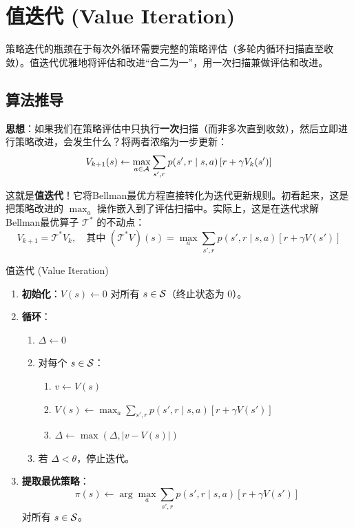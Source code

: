 \section{值迭代 (Value Iteration)}

策略迭代的瓶颈在于每次外循环需要完整的策略评估（多轮内循环扫描直至收敛）。值迭代优雅地将评估和改进``合二为一''，用一次扫描兼做评估和改进。

\subsection{算法推导}

\textbf{思想}：如果我们在策略评估中只执行\textbf{一次}扫描（而非多次直到收敛），然后立即进行策略改进，会发生什么？将两者浓缩为一步更新：
\[
V_{k+1}(s) \leftarrow \max_{a \in \mathcal{A}} \sum_{s', r} p(s', r \mid s, a) \left[ r + \gamma V_k(s') \right]
\]

这就是\textbf{值迭代}！它将Bellman最优方程直接转化为迭代更新规则。初看起来，这是把策略改进的 $\max_a$ 操作嵌入到了评估扫描中。实际上，这是在迭代求解Bellman最优算子 $\mathcal{T}^{*}$ 的不动点：
\[
V_{k+1} = \mathcal{T}^{*} V_k, \quad \text{其中 } (\mathcal{T}^{*} V)(s) = \max_a \sum_{s', r} p(s', r \mid s, a) [r + \gamma V(s')]
\]

\begin{myalgorithm}{值迭代 (Value Iteration)}
\begin{enumerate}
    \item \textbf{初始化}：$V(s) \leftarrow 0$ 对所有 $s \in \mathcal{S}$（终止状态为 $0$）。
    \item \textbf{循环}：
    \begin{enumerate}
        \item $\Delta \leftarrow 0$
        \item 对每个 $s \in \mathcal{S}$：
        \begin{enumerate}
            \item $v \leftarrow V(s)$
            \item $V(s) \leftarrow \max_{a} \sum_{s', r} p(s', r \mid s, a) \left[ r + \gamma V(s') \right]$
            \item $\Delta \leftarrow \max(\Delta, |v - V(s)|)$
        \end{enumerate}
        \item 若 $\Delta < \theta$，停止迭代。
    \end{enumerate}
    \item \textbf{提取最优策略}：
    \[
    \pi(s) \leftarrow \arg\max_{a} \sum_{s', r} p(s', r \mid s, a) \left[ r + \gamma V(s') \right]
    \]
    对所有 $s \in \mathcal{S}$。
\end{enumerate}
\end{myalgorithm}


